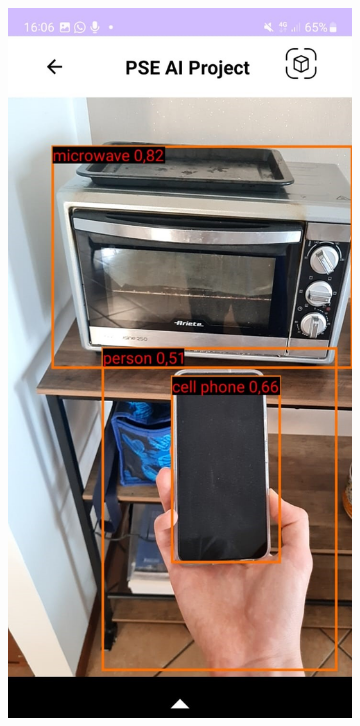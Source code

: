 \begin{figure}[H]
  \centering
  \begin{subfigure}[b]{0.3\textwidth}
    \includegraphics[width=\textwidth, height=0.45\textheight]{Immagini/App/funzionamento_3rettangoli.jpeg}

\end{subfigure}
\end{figure}
